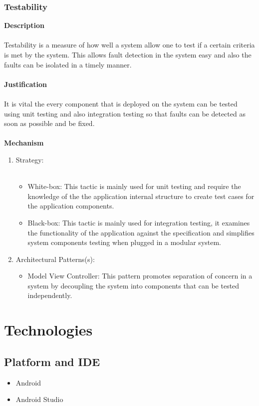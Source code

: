 \documentclass[hidelinks, 12pt, oneside]{article}
\begin{document}
			\subsubsection{Testability}
			\textbf{Description}\\\\
			Testability is a measure of how well a system allow one to test if a certain criteria is met by the system. This allows fault detection in the system easy and also the faults can be isolated in a timely manner.\\\\
			\textbf{Justification}\\\\
			It is vital the every component that is deployed on the system can be tested using unit testing and also integration testing so that faults can be detected as soon as possible and be fixed. \\\\
			\textbf{Mechanism}
			\begin{enumerate}
				\item Strategy:\\\\
				\begin{itemize}
				\item White-box: This tactic is mainly used for unit testing and require the knowledge of the the application internal structure to create test cases for the application components.
				\item Black-box: This tactic is mainly used for integration testing, it examines the functionality of the application against the specification and simplifies system components testing when plugged in a modular system.
				\end{itemize}
				\item Architectural Patterns(s):
				\begin{itemize}
				\item Model View Controller: This pattern promotes separation of concern in a system by decoupling the system into components that can be tested independently.   
				\end{itemize}
			\end{enumerate}	
	\newpage
	\section{Technologies}
	\subsection{Platform and IDE}
	\begin{itemize}
	\item Android
	\item Android Studio
	\end{itemize}
\end{document}
